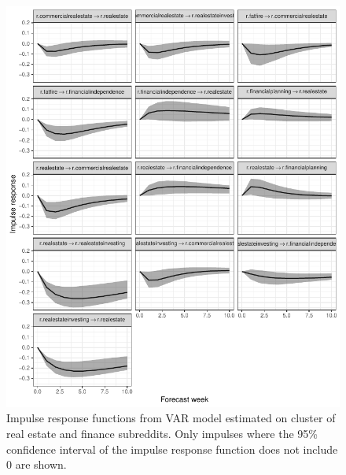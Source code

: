 \documentclass[manuscript]{acmart}\usepackage[]{graphicx}\usepackage[]{color}
\makeatletter
\def\maxwidth{ %
  \ifdim\Gin@nat@width>\linewidth
    \linewidth
  \else
    \Gin@nat@width
  \fi
}
\makeatother
\begin{document}
\begin{figure}[h]
\centering

\includegraphics[width=\maxwidth]{figures/knitr-comp_irf-1} 

\caption{Impulse response functions from VAR model estimated on cluster of real estate and finance subreddits. Only impulses where the 95\% confidence interval of the impulse response function does not include 0 are shown. \label{comp.irf}}
\end{figure}
\end{document}
